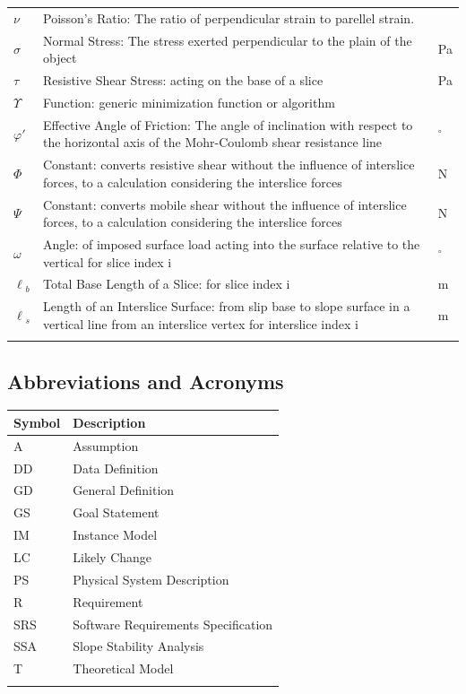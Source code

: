 \documentclass[12pt]{article}
\begin{document}
\begin{longtable*}{l l l}
\\
$\nu{}$ & Poisson's Ratio: The ratio of perpendicular strain to parellel strain. & 
\\
$\sigma{}$ & Normal Stress: The stress exerted perpendicular to the plain of the object & Pa
\\
$\tau{}$ & Resistive Shear Stress: acting on the base of a slice & Pa
\\
$\Upsilon{}$ & Function: generic minimization function or algorithm & 
\\
$\varphi{}'$ & Effective Angle of Friction: The angle of inclination with respect to the horizontal axis of the Mohr-Coulomb shear resistance line & ${}^{\circ}$
\\
$\Phi{}$ & Constant: converts resistive shear without the influence of interslice forces, to a calculation considering the interslice forces & N
\\
$\Psi{}$ & Constant: converts mobile shear without the influence of interslice forces, to a calculation considering the interslice forces & N
\\
$\omega{}$ & Angle: of imposed surface load acting into the surface relative to the vertical for slice index i & ${}^{\circ}$
\\
$\ell{}_{b}$ & Total Base Length of a Slice: for slice index i & m
\\
$\ell{}_{s}$ & Length of an Interslice Surface: from slip base to slope surface in a vertical line from an interslice vertex for interslice index i & m
\\
\bottomrule
\label{Table:TablofSymb}
\end{longtable*}
\subsection{Abbreviations and Acronyms}
\label{Sec:AbbrandAcro}
\begin{longtable*}{l l}
\toprule
Symbol & Description
\\
\midrule
A & Assumption
\\
DD & Data Definition
\\
GD & General Definition
\\
GS & Goal Statement
\\
IM & Instance Model
\\
LC & Likely Change
\\
PS & Physical System Description
\\
R & Requirement
\\
SRS & Software Requirements Specification
\\
SSA & Slope Stability Analysis
\\
T & Theoretical Model
\\
\bottomrule
\label{Table:AbbrandAcro}
\end{longtable*}
\end{document}
